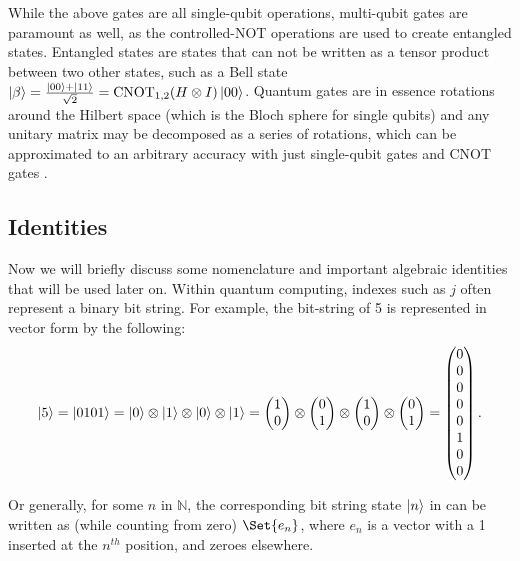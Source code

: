 While the above gates are all single-qubit operations, multi-qubit gates are paramount as well,  as the controlled-NOT operations are used to create entangled states. Entangled states are states that can not be written as a tensor product between two other states, such as a Bell state $\left\vert{\beta}\right\rangle = \frac{\left\vert{00}\right\rangle+ \left\vert{11}\right\rangle}{\sqrt{2}} = \text{CNOT}_{1,2}(H \otimes I) \left\vert{00}\right\rangle$. Quantum gates are in essence rotations around the Hilbert space (which is the Bloch sphere for single qubits) and any unitary matrix may be decomposed as a series of rotations, which can be approximated to an arbitrary accuracy with just single-qubit gates and CNOT gates \cite{McArdle}. \\

\subsection{Identities}

Now we will briefly discuss some nomenclature and important algebraic identities that will be used later on. Within quantum computing, indexes such as $j$ often represent a binary bit string. For example, the bit-string of 5 is represented in vector form by the following:
$$ \left\vert{5}\right\rangle = \left\vert{0101}\right\rangle = \left\vert{0}\right\rangle \otimes \left\vert{1}\right\rangle \otimes \left\vert{0}\right\rangle \otimes \left\vert{1}\right\rangle = \begin{pmatrix} 1 \\ 0 \end{pmatrix} \otimes \begin{pmatrix} 0 \\ 1 \end{pmatrix} \otimes \begin{pmatrix} 1 \\ 0 \end{pmatrix} \otimes \begin{pmatrix} 0 \\ 1 \end{pmatrix} =   \begin{pmatrix} 0 \\ 0 \\ 0 \\0 \\ 0 \\ 1 \\ 0 \\ 0 \end{pmatrix}.$$

Or generally, for some $n$ in $\mathbb{N}$, the corresponding bit string state $\left\vert{n}\right\rangle$ in can be written as (while counting from zero) $\Set{e_{n}}$, where $e_{n}$ is a vector with a 1 inserted at the $n^{th}$ position, and zeroes elsewhere. \\

